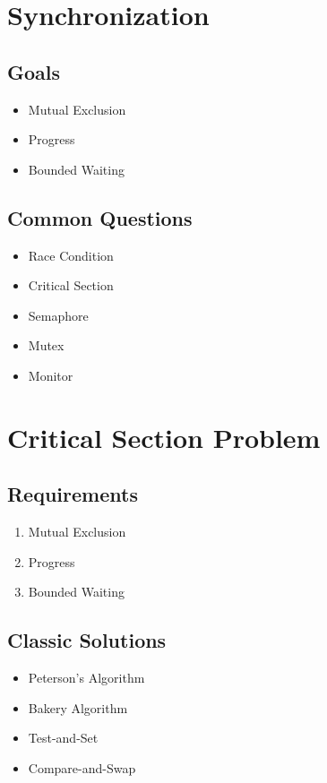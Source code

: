 \section{Synchronization}

\subsection*{Goals}

\begin{itemize}
\item Mutual Exclusion
\item Progress
\item Bounded Waiting
\end{itemize}

\subsection*{Common Questions}

\begin{itemize}
\item Race Condition
\item Critical Section
\item Semaphore
\item Mutex
\item Monitor
\end{itemize}

\section{Critical Section Problem}

\subsection*{Requirements}

\begin{enumerate}
\item Mutual Exclusion
\item Progress
\item Bounded Waiting
\end{enumerate}

\subsection*{Classic Solutions}

\begin{itemize}
\item Peterson's Algorithm
\item Bakery Algorithm
\item Test-and-Set
\item Compare-and-Swap
\end{itemize}

